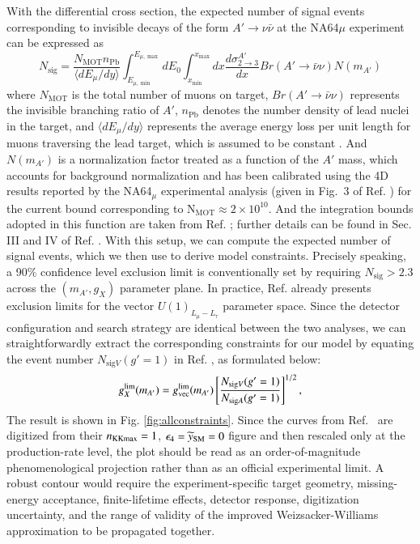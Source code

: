 \documentclass[onecolumn, aps, nofootinbib, prd, preprint, floats, floatfix, amsmath, amssymb, superscriptaddress, preprintnumbers]{revtex4-2}
\begin{document}
With the differential cross section, the expected number of signal events corresponding to invisible decays of the form $A' \to \nu\bar{\nu}$ at the NA64$\mu$ experiment can be expressed as
\begin{equation}
N_{\text{sig}} = \frac{N_{\text{MOT}} n_{\text{Pb}}}{\langle dE_\mu/dy \rangle} \int_{E_{\mu,\min}}^{E_{\mu,\max}} dE_0 \int_{x_{\min}}^{x_{\max}} dx \frac{d\sigma_{2\to3}^{A'}}{dx} Br(A' \to \bar{\nu}\nu) N(m_{A'})
\label{eq:NA64Signal}
\end{equation}
where $N_{\text{MOT}}$ is the total number of muons on target, $Br(A'\to\bar{\nu}\nu)$ represents the invisible branching ratio of $A'$, $n_{\text{Pb}}$ denotes the number density of lead nuclei in the target, and $\langle dE_\mu/dy\rangle$ represents the average energy loss per unit length for muons traversing the lead target, which is assumed to be constant \cite{navas2024review}. And $N(m_{A'})$ is a normalization factor treated as a function of the $A'$ mass, which accounts for background normalization and has been calibrated using the 4D results reported by the NA64$_\mu$ experimental analysis (given in Fig.~3 of Ref. \cite{andreev2024exploration}) for the current bound corresponding to $\mathrm{N_{MOT}} \approx 2 \times 10^{10}$. And the integration bounds adopted in this function are taken from Ref. \cite{Chakraborty:2025jbd}; further details can be found in Sec. III and IV of Ref. \cite{Chakraborty:2025jbd}. With this setup, we can compute the expected number of signal events, which we then use to derive model constraints. Precisely speaking, a 90\% confidence level exclusion limit is conventionally set by requiring $N_{\text{sig}} > 2.3$ across the $(m_{A'}, g_X)$ parameter plane. In practice, Ref. \cite{Chakraborty:2025jbd} already presents exclusion limits for the vector $U(1)_{L_\mu-L_\tau}$ parameter space. Since the detector configuration and search strategy are identical between the two analyses, we can straightforwardly extract the corresponding constraints for our model by equating the event number $N_{\text{sig}V}(g'=1)$ in Ref. \cite{Chakraborty:2025jbd}, as formulated below:
\begin{equation}
g_X^{\rm lim}(m_{A'})
=g_{\rm vec}^{\rm lim}(m_{A'})
\left[
\frac{N_{\text{sig}V}(g'=1)}{N_{\text{sig}A}(g'=1)}
\right]^{1/2},
\label{eq:beamdump-rescale}
\end{equation}
The result is shown in Fig. \ref{fig:allconstraints}. Since the curves from Ref.~\cite{Chakraborty:2025jbd} are digitized from their $n_{\rm KKmax}=1$, $\epsilon_4=\widetilde y_{\rm SM}=0$ figure and then rescaled only at the production-rate level, the plot should be read as an order-of-magnitude phenomenological projection rather than as an official experimental limit. A robust contour would require the experiment-specific target geometry, missing-energy acceptance, finite-lifetime effects, detector response, digitization uncertainty, and the range of validity of the improved Weizsacker-Williams approximation to be propagated together.
\end{document}
